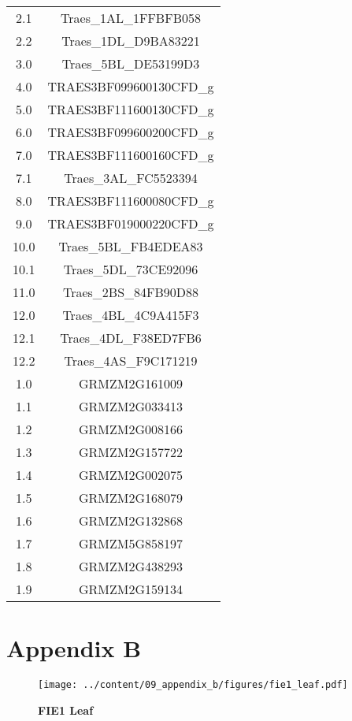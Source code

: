 \documentclass[12pt,]{book}
\begin{document}
\begin{table}[htp]
\begin{center}
\begin{tabular}{cc}
2.1  & Traes\_1AL\_1FFBFB058    \\
2.2  & Traes\_1DL\_D9BA83221    \\
3.0  & Traes\_5BL\_DE53199D3    \\
4.0  & TRAES3BF099600130CFD\_g \\
5.0  & TRAES3BF111600130CFD\_g \\
6.0  & TRAES3BF099600200CFD\_g \\
7.0  & TRAES3BF111600160CFD\_g \\
7.1  & Traes\_3AL\_FC5523394    \\
8.0  & TRAES3BF111600080CFD\_g \\
9.0  & TRAES3BF019000220CFD\_g \\
10.0 & Traes\_5BL\_FB4EDEA83    \\
10.1 & Traes\_5DL\_73CE92096    \\
11.0 & Traes\_2BS\_84FB90D88    \\
12.0 & Traes\_4BL\_4C9A415F3    \\
12.1 & Traes\_4DL\_F38ED7FB6    \\
12.2 & Traes\_4AS\_F9C171219    \\
1.0  & GRMZM2G161009          \\
1.1  & GRMZM2G033413          \\
1.2  & GRMZM2G008166          \\
1.3  & GRMZM2G157722          \\
1.4  & GRMZM2G002075          \\
1.5  & GRMZM2G168079          \\
1.6  & GRMZM2G132868          \\
1.7  & GRMZM5G858197          \\
1.8  & GRMZM2G438293          \\
1.9  & GRMZM2G159134          \\
\bottomrule
\end{tabular}
\end{center}
\end{table}

\chapter*{Appendix B}\label{chapter:appendixb}

\begin{figure}[htbp]
\centering
\texttt{[image: ../content/09\_appendix\_b/figures/fie1\_leaf.pdf]}
\caption{\textbf{FIE1 Leaf}}\label{figure:3xx:fie1msi1leaf}
\end{figure}
\end{document}
